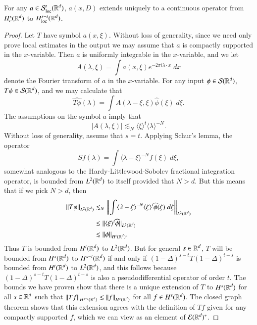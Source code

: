 \begin{theorem}
    For any $a \in \mathcal{S}^t_{\text{loc}}(\operatorname{\mathbb{R}}^d)$, $a(x,D)$ extends uniquely to a continuous operator from $H^s_c(\operatorname{\mathbb{R}}^d)$ to $H^{s-t}_{\text{loc}}(\operatorname{\mathbb{R}}^d)$.
\end{theorem}
\begin{proof}
    Let $T$ have symbol $a(x,\xi)$. Without loss of generality, since we need only prove local estimates in the output we may assume that $a$ is compactly supported in the $x$-variable. Then $a$ is uniformly integrable in the $x$-variable, and we let
    \[ A(\lambda,\xi) = \int a(x,\xi) e^{-2 \pi i \lambda \cdot x}\; dx \]
    denote the Fourier transform of $a$ in the $x$-variable. For any input $\phi \in \mathcal{S}(\operatorname{\mathbb{R}}^d)$, $T\phi \in \mathcal{S}(\operatorname{\mathbb{R}}^d)$, and we may calculate that
    \[ \widehat{T\phi}(\lambda) = \int A(\lambda - \xi,\xi) \widehat{\phi}(\xi)\; d\xi. \]
    The assumptions on the symbol $a$ imply that
    \[ |A(\lambda,\xi)| \lesssim_N \langle \xi \rangle^t \langle \lambda \rangle^{-N}. \]
    Without loss of generality, assume that $s = t$. Applying Schur's lemma, the operator
    \[ Sf(\lambda) = \int \langle \lambda - \xi \rangle^{-N} f(\xi)\; d\xi, \]
    somewhat analogous to the Hardy-Littlewood-Sobolev fractional integration operator, is bounded from $L^2(\operatorname{\mathbb{R}}^d)$ to itself provided that $N > d$. But this means that if we pick $N > d$, then
    \begin{align*}
        \| T\phi \|_{L^2(\operatorname{\mathbb{R}}^d)} &\lesssim_N \left\| \int \langle \lambda - \xi \rangle^{-N} \langle \xi \rangle^t \widehat{\phi}(\xi)\; d\xi \right\|_{L^2(\operatorname{\mathbb{R}}^d)}\\
        &\lesssim \| \langle \xi \rangle^t \widehat{\phi} \|_{L^2(\operatorname{\mathbb{R}}^d)}\\
        &\lesssim \| \phi \|_{H^t(\operatorname{\mathbb{R}}^d)}.
    \end{align*}
    Thus $T$ is bounded from $H^t(\operatorname{\mathbb{R}}^d)$ to $L^2(\operatorname{\mathbb{R}}^d)$. But for general $s \in \operatorname{\mathbb{R}}^d$, $T$ will be bounded from $H^s(\operatorname{\mathbb{R}}^d)$ to $H^{s-t}(\operatorname{\mathbb{R}}^d)$ if and only if $(1 - \Delta)^{s-t} T (1 - \Delta)^{t-s}$ is bounded from $H^t(\operatorname{\mathbb{R}}^d)$ to $L^2(\operatorname{\mathbb{R}}^d)$, and this follows because $(1 - \Delta)^{s-t} T (1 - \Delta)^{t-s}$ is also a pseudodifferential operator of order $t$. The bounds we have proven show that there is a unique extension of $T$ to $H^s(\operatorname{\mathbb{R}}^d)$ for all $s \in \operatorname{\mathbb{R}}^d$ such that $\| Tf \|_{H^{s-t}(\operatorname{\mathbb{R}}^d)} \lesssim \| f \|_{H^s(\operatorname{\mathbb{R}}^d)}$ for all $f \in H^s(\operatorname{\mathbb{R}}^d)$. The closed graph theorem shows that this extension agrees with the definition of $Tf$ given for any compactly supported $f$, which we can view as an element of $\mathcal{E}(\operatorname{\mathbb{R}}^d)^*$.
\end{proof}

